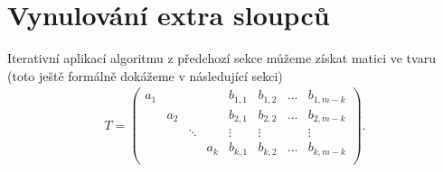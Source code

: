 \section{Vynulování extra sloupců}
Iterativní aplikací algoritmu z předchozí sekce můžeme získat matici ve tvaru
(toto ještě formálně dokážeme v následující sekci)
\begin{align} \label{extra_cols}
T =
    \left(
    \begin{array}{cccc|cccc}
        a_1 &     &        &     & b_{1,1} & b_{1,2} & \hdots & b_{1,m-k} \\
            & a_2 &        &     & b_{2,1} & b_{2,2} & \hdots & b_{2,m-k} \\
            &     & \ddots &     & \vdots  & \vdots  &        & \vdots    \\
            &     &        & a_k & b_{k,1} & b_{k,2} & \hdots & b_{k,m-k} \\
    \end{array}
    \right).
\end{align}

